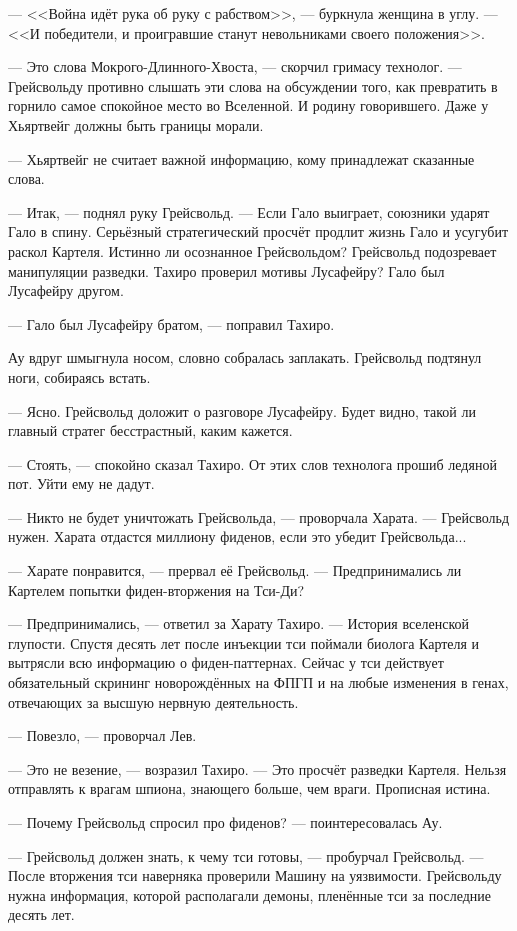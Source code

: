 --- <<Война идёт рука об руку с рабством>>, --- буркнула женщина в углу. --- <<И победители, и проигравшие станут невольниками своего положения>>.

--- Это слова Мокрого-Длинного-Хвоста, --- скорчил гримасу технолог.
--- Грейсвольду противно слышать эти слова на обсуждении того, как превратить в горнило самое спокойное место во Вселенной.
И родину говорившего.
Даже у Хьяртвейг должны быть границы морали.

--- Хьяртвейг не считает важной информацию, кому принадлежат сказанные слова.

--- Итак, --- поднял руку Грейсвольд.
--- Если Гало выиграет, союзники ударят Гало в спину.
Серьёзный стратегический просчёт продлит жизнь Гало и усугубит раскол Картеля.
Истинно ли осознанное Грейсвольдом?
Грейсвольд подозревает манипуляции разведки.
Тахиро проверил мотивы Лусафейру?
Гало был Лусафейру другом.

--- Гало был Лусафейру братом, --- поправил Тахиро.

Ау вдруг шмыгнула носом, словно собралась заплакать.
Грейсвольд подтянул ноги, собираясь встать.

--- Ясно.
Грейсвольд доложит о разговоре Лусафейру.
Будет видно, такой ли главный стратег бесстрастный, каким кажется.

--- Стоять, --- спокойно сказал Тахиро.
От этих слов технолога прошиб ледяной пот.
Уйти ему не дадут.

--- Никто не будет уничтожать Грейсвольда, --- проворчала Харата.
--- Грейсвольд нужен.
Харата отдастся миллиону фиденов, если это убедит Грейсвольда...

--- Харате понравится, --- прервал её Грейсвольд.
--- Предпринимались ли Картелем попытки фиден-вторжения на Тси-Ди?

--- Предпринимались, --- ответил за Харату Тахиро.
--- История вселенской глупости.
Спустя десять лет после инъекции тси поймали биолога Картеля и вытрясли всю информацию о фиден-паттернах.
Сейчас у тси действует обязательный скрининг новорождённых на ФПГП и на любые изменения в генах, отвечающих за высшую нервную деятельность.

--- Повезло, --- проворчал Лев.

--- Это не везение, --- возразил Тахиро.
--- Это просчёт разведки Картеля.
Нельзя отправлять к врагам шпиона, знающего больше, чем враги.
Прописная истина.

--- Почему Грейсвольд спросил про фиденов? --- поинтересовалась Ау.

--- Грейсвольд должен знать, к чему тси готовы, --- пробурчал Грейсвольд.
--- После вторжения тси наверняка проверили Машину на уязвимости.
Грейсвольду нужна информация, которой располагали демоны, пленённые тси за последние десять лет.

